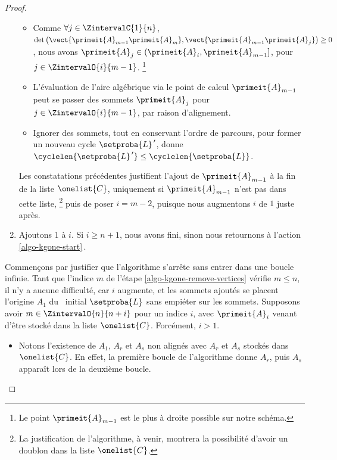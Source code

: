 \begin{proof}
\begin{enumerate}[label=\fbox{\small\bfseries\textsf{A\kern.25pt\arabic*}}]
\begin{itemize}
            \item Comme 
            $\forall j \in \ZintervalC{1}{n}$,
            $\det \big( \vect{\primeit{A}_{m-1} \primeit{A}_m}, \vect{\primeit{A}_{m-1} \primeit{A}_{j}} \big) \geq 0$, 
            nous avons
            $\primeit{A}_{j} \in ( \primeit{A}_i , \primeit{A}_{m-1} ]$,
            pour $j \in \ZintervalO{i}{m-1}$.%
            \footnote{
        	    Le point $\primeit{A}_{m-1}$ est le plus à droite possible sur notre schéma.
            }

            \item L'évaluation de l'aire algébrique via le point de calcul $\primeit{A}_{m-1}$ peut se passer des sommets $\primeit{A}_j$ pour $j \in \ZintervalO{i}{m-1}$, par raison d'alignement.

            \item Ignorer des sommets, tout en conservant l'ordre de parcours, pour former un nouveau cycle $\setproba{L}^{\,\prime}$, donne $\cyclelen{\setproba{L}^{\,\prime}} \leq \cyclelen{\setproba{L}} $.
        \end{itemize}
        
        \noindent
        Les constatations précédentes justifient l'ajout de
        $\primeit{A}_{m-1}$ à la fin de la liste $\onelist{C}$, uniquement si $\primeit{A}_{m-1}$ n'est pas dans cette liste,%
        \footnote{
        	La justification de l'algorithme, à venir, montrera la possibilité d'avoir un doublon dans la liste $\onelist{C}$.
        }
        puis de poser $i = m - 2$, puisque nous augmentons $i$ de $1$ juste après.

	
		\item \label{algo-kgone-loop-back}
		Ajoutons $1$ à $i$.
		Si $i \geq n+1$, nous avons fini, sinon nous retournons à l'action \ref{algo-kgone-start}\,.
    \end{enumerate}
    

    \medskip

    
    Commençons par justifier que l'algorithme s'arrête sans entrer dans une boucle infinie.
    Tant que l'indice $m$ de l'étape \ref{algo-kgone-remove-vertices} vérifie $m \leq n$, il n'y a aucune difficulté, car $i$ augmente, et les sommets ajoutés se placent  l'origine $A_1$ du \ncycle\ initial $\setproba{L}$ sans empiéter sur les  sommets.
    Supposons avoir $m \in \ZintervalO{n}{n+i}$ pour un indice $i$, avec $\primeit{A}_i$ venant d'être stocké dans la liste $\onelist{C}$.
    Forcément, $i > 1$.
    \begin{itemize}
        \item Notons l'existence de $A_1$, $A_r$ et $A_s$ non alignés avec $A_r$ et $A_s$ stockés dans $\onelist{C}$.
        En effet,
        la première boucle de l'algorithme donne $A_r$, puis $A_s$ apparaît lors de la deuxième boucle.



\end{itemize}
\end{proof}
